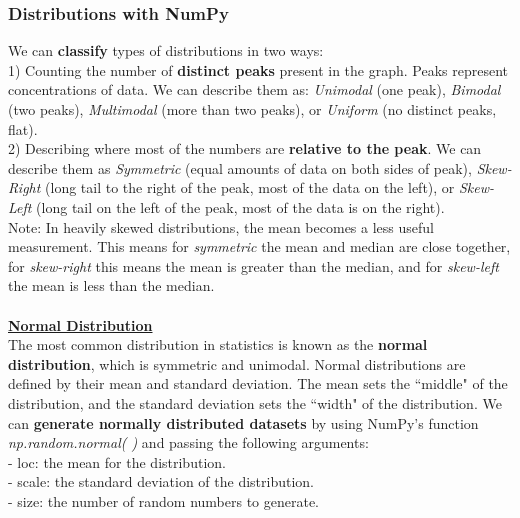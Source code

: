 \documentclass[11pt, a4paper]{article}
\begin{document}
\begin{spacing}{1.1}
	\subsubsection{Distributions with NumPy}
	We can \textbf{classify} types of distributions in two ways: \vspace*{1mm} \\
	1) Counting the number of \textbf{distinct peaks} present in the graph. Peaks represent concentrations of data. We can describe them as: \textit{Unimodal} (one peak), \textit{Bimodal} (two peaks), \textit{Multimodal} (more than two peaks), or \textit{Uniform} (no distinct peaks, flat). \vspace*{2mm} \\
	2) Describing where most of the numbers are \textbf{relative to the peak}. We can describe them as \textit{Symmetric} (equal amounts of data on both sides of peak), \textit{Skew-Right} (long tail to the right of the peak, most of the data on the left), or \textit{Skew-Left} (long tail on the left of the peak, most of the data is on the right). \vspace*{2mm} \\
	Note: In heavily skewed distributions, the mean becomes a less useful measurement. This means for \textit{symmetric} the mean and median are close together, for \textit{skew-right} this means the mean is greater than the median, and for \textit{skew-left} the mean is less than the median. \\~\\
	\underline{\textbf{Normal Distribution}} \\
	The most common distribution in statistics is known as the \textbf{normal distribution}, which is symmetric and unimodal. Normal distributions are defined by their mean and standard deviation. The mean sets the ``middle" of the distribution, and the standard deviation sets the ``width" of the distribution. \newpage
	\noindent We can \textbf{generate normally distributed datasets} by using NumPy's function \textit{np.random.normal( )} and passing the following arguments: \\
	\hspace*{3mm} - loc: the mean for the distribution. \\
	\hspace*{3mm} - scale: the standard deviation of the distribution. \\
	\hspace*{3mm} - size: the number of random numbers to generate.
	\begin{lstlisting}[language=Python]

\end{lstlisting}
\end{spacing}
\end{document}
